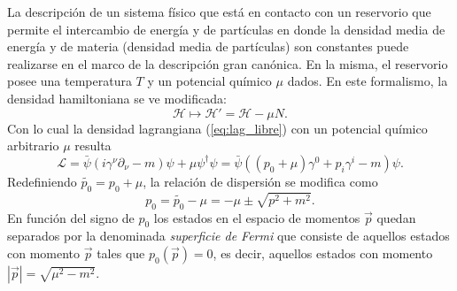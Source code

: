 La descripción de un sistema físico que está en contacto con un reservorio que permite el intercambio de energía y de partículas en donde la densidad media de energía y de materia (densidad media de partículas) son constantes puede realizarse en el marco de la descripción gran canónica. En la misma, el reservorio posee una temperatura $T$ y un potencial químico $\mu$ dados. En este formalismo, la densidad hamiltoniana se ve modificada:
\begin{equation}
\mathcal{H}\mapsto \mathcal{H}'=\mathcal{H}-\mu N.
\end{equation}
Con lo cual la densidad lagrangiana (\ref{eq:lag_libre}) con un potencial químico arbitrario $\mu$ resulta
\begin{equation}
\mathcal{L}=\bar{\psi}(i\gamma^{\nu}\partial_{\nu}-m)\psi+\mu \psi^{\dag}\psi =\bar{\psi}\left((p_0+\mu)\gamma^0+p_i\gamma^i-m\right)\psi.
\label{eq:ec_dirac}
\end{equation}
Redefiniendo $\tilde{p_0}=p_0+\mu$, la relación de dispersión se modifica como
\begin{equation}
p_0=\tilde{p_0}-\mu=-\mu \pm \sqrt{p^2+m^2}.
\end{equation}
En función del signo de $p_0$ los estados en el espacio de momentos $\vec{p}$ quedan separados por la denominada \textit{superficie de Fermi} que consiste de aquellos estados con momento $\vec{p}$ tales que $p_0(\vec{p})=0$, es decir, aquellos estados con momento $|\vec{p}|=\sqrt{\mu^2-m^2}$.
